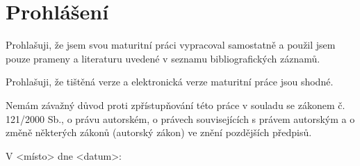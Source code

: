 \section*{Prohlášení}

Prohlašuji, že jsem svou maturitní práci vypracoval samostatně a použil jsem
pouze prameny a literaturu uvedené v seznamu bibliografických záznamů.

Prohlašuji, že tištěná verze a elektronická verze maturitní práce jsou shodné.

Nemám závažný důvod proti zpřístupňování této práce v souladu se zákonem č. 121/2000 Sb., o právu autorském, o právech souvisejících s právem autorským a o změně některých zákonů (autorský zákon) ve znění pozdějších předpisů.

V <místo> dne <datum>: \hrulefill
